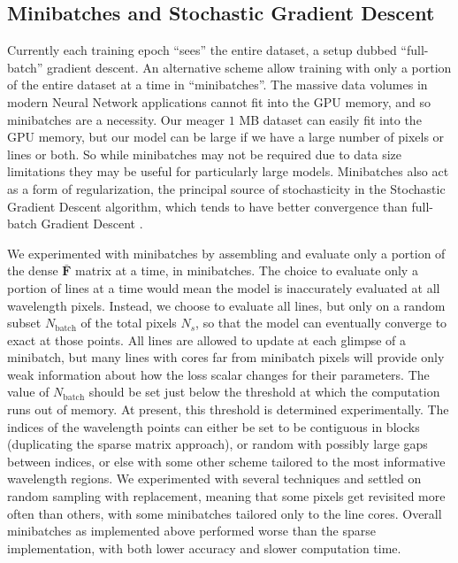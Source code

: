 \documentclass[modern]{aastex631}
\begin{document}
\subsection{Minibatches and Stochastic Gradient Descent}

Currently each training epoch ``sees'' the entire dataset, a setup dubbed ``full-batch'' gradient descent.  An alternative scheme allow training with only a portion of the entire dataset at a time in ``minibatches''.  The massive data volumes in modern Neural Network applications cannot fit into the GPU memory, and so minibatches are a necessity.  Our meager $1$ MB dataset can easily fit into the GPU memory, but our model can be large if we have a large number of pixels or lines or both.  So while minibatches may not be required due to data size limitations they may be useful for particularly large models.  Minibatches also act as a form of regularization, the principal source of stochasticity in the Stochastic Gradient Descent algorithm, which tends to have better convergence than full-batch Gradient Descent \citep{2016arXiv160904747R}.

We experimented with minibatches by assembling and evaluate only a portion of the dense $\bar{\bm{F}}$ matrix at a time, in minibatches. The choice to evaluate only a portion of lines at a time would mean the model is inaccurately evaluated at all wavelength pixels. Instead, we choose to evaluate all lines, but only on a random subset $N_{\mathrm{batch}}$ of the total pixels $N_s$, so that the model can eventually converge to exact at those points. All lines are allowed to update at each glimpse of a minibatch, but many lines with cores far from minibatch pixels will provide only weak information about how the loss scalar changes for their parameters. The value of $N_{\mathrm{batch}}$ should be set just below the threshold at which the computation runs out of memory. At present, this threshold is determined experimentally. The indices of the wavelength points can either be set to be contiguous in blocks (duplicating the sparse matrix approach), or random with possibly large gaps between indices, or else with some other scheme tailored to the most informative wavelength regions. We experimented with several techniques and settled on random sampling with replacement, meaning that some pixels get revisited more often than others, with some minibatches tailored only to the line cores.  Overall minibatches as implemented above performed worse than the sparse implementation, with both lower accuracy and slower computation time.
\end{document}
